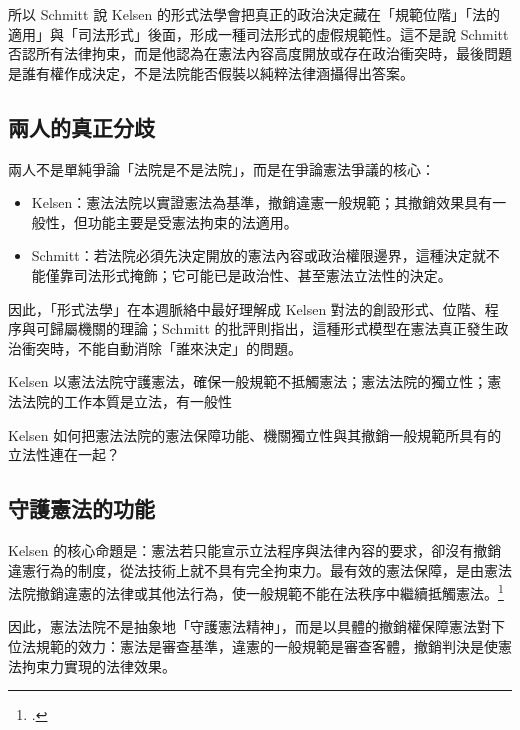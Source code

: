 所以 Schmitt 說 Kelsen 的形式法學會把真正的政治決定藏在「規範位階」「法的適用」與「司法形式」後面，形成一種司法形式的虛假規範性。這不是說 Schmitt 否認所有法律拘束，而是他認為在憲法內容高度開放或存在政治衝突時，最後問題是誰有權作成決定，不是法院能否假裝以純粹法律涵攝得出答案。

\subsection{兩人的真正分歧}

兩人不是單純爭論「法院是不是法院」，而是在爭論憲法爭議的核心：

\begin{itemize}
\tightlist
\item
  Kelsen：憲法法院以實證憲法為基準，撤銷違憲一般規範；其撤銷效果具有一般性，但功能主要是受憲法拘束的法適用。
\item
  Schmitt：若法院必須先決定開放的憲法內容或政治權限邊界，這種決定就不能僅靠司法形式掩飾；它可能已是政治性、甚至憲法立法性的決定。
\end{itemize}

因此，「形式法學」在本週脈絡中最好理解成 Kelsen 對法的創設形式、位階、程序與可歸屬機關的理論；Schmitt 的批評則指出，這種形式模型在憲法真正發生政治衝突時，不能自動消除「誰來決定」的問題。


\begin{qaprompt}
Kelsen 以憲法法院守護憲法，確保一般規範不抵觸憲法；憲法法院的獨立性；憲法法院的工作本質是立法，有一般性
\end{qaprompt}

\begin{qaquestion}
Kelsen 如何把憲法法院的憲法保障功能、機關獨立性與其撤銷一般規範所具有的立法性連在一起？
\end{qaquestion}

\subsection{守護憲法的功能}

Kelsen 的核心命題是：憲法若只能宣示立法程序與法律內容的要求，卻沒有撤銷違憲行為的制度，從法技術上就不具有完全拘束力。最有效的憲法保障，是由憲法法院撤銷違憲的法律或其他法行為，使一般規範不能在法秩序中繼續抵觸憲法。\footcites[43--45]{kelsen2015}[51--53]{kelsen1929}

因此，憲法法院不是抽象地「守護憲法精神」，而是以具體的撤銷權保障憲法對下位法規範的效力：憲法是審查基準，違憲的一般規範是審查客體，撤銷判決是使憲法拘束力實現的法律效果。

